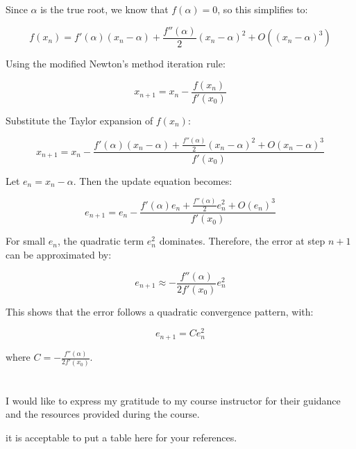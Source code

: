 \documentclass[a4paper]{article}
\begin{document}
Since \( \alpha \) is the true root, we know that \( f(\alpha) = 0 \), so this simplifies to:

\[
f(x_n) = f'(\alpha)(x_n - \alpha) + \frac{f''(\alpha)}{2}(x_n - \alpha)^2 + O((x_n - \alpha)^3)
\]


Using the modified Newton’s method iteration rule:

\[
x_{n+1} = x_n - \frac{f(x_n)}{f'(x_0)}
\]

Substitute the Taylor expansion of \( f(x_n) \):

\[
x_{n+1} = x_n - \frac{f'(\alpha)(x_n - \alpha) + \frac{f''(\alpha)}{2}(x_n - \alpha)^2+ O(x_n - \alpha)^3}{f'(x_0)}
\]

Let \( e_n = x_n - \alpha \). Then the update equation becomes:

\[
e_{n+1} = e_n - \frac{f'(\alpha)e_n + \frac{f''(\alpha)}{2}e_n^2+ O(e_n)^3}{f'(x_0)}
\]


For small \( e_n \), the quadratic term \( e_n^2 \) dominates. Therefore, the error at step \( n+1 \) can be approximated by:

\[
e_{n+1} \approx - \frac{f''(\alpha)}{2 f'(x_0)} e_n^2
\]

This shows that the error follows a quadratic convergence pattern, with:

\[
e_{n+1} = C e_n^2
\]

where \( C = - \frac{f''(\alpha)}{2 f'(x_0)} \).



\section*{  }

I would like to express my gratitude to my course instructor for their guidance and the resources provided during the course.


it is acceptable to put a table here for your references.
\end{document}

